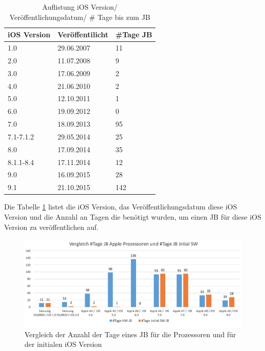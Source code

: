 \begin{table}[htp!]
    \begin{center}
        \begin{tabular}{|l|l|l|} \hline
         \textbf{iOS Version} & \textbf{Veröffentilicht} & \textbf{\#Tage JB}\\ \hline    
        1.0 & 29.06.2007 & 11\\ \hline 
        2.0 & 11.07.2008	& 9\\ \hline 
        3.0 & 17.06.2009	& 2\\ \hline 
        4.0 & 21.06.2010 & 2\\ \hline 
        5.0 & 12.10.2011	& 1\\ \hline 
        6.0 & 19.09.2012	& 0\\ \hline 
        7.0 & 18.09.2013	& 95\\ \hline 
        7.1-7.1.2 & 29.05.2014 & 25\\ \hline 
        8.0 & 17.09.2014	& 35\\ \hline 
        8.1.1-8.4 & 17.11.2014	& 12\\ \hline 
        9.0 & 16.09.2015	& 28\\ \hline
        9.1 & 21.10.2015	& 142\\ \hline 
        \end{tabular} 
        \caption{Auflistung iOS Version/ Veröffentlichungsdatum/ \# Tage bis zum JB}
        \label{tab:iOSVersion}
    \end{center}
\end{table}

Die Tabelle \ref{tab:iOSVersion} listet die iOS Version, das Veröffentlichungsdatum diese iOS Version und die Anzahl an Tagen die benötigt wurden, um einen JB für diese iOS Version zu veröffentlichen auf.   
\begin{figure}[htbp]
        \centering
                \includegraphics[scale=0.55]{Bilder/iDeviceJB-SW-HW.png}
         \caption{Vergleich der Anzahl der Tage eines JB für die Prozessoren und für der initialen iOS Version}
        \label{fig:VergleichJBProzessorSW}      
\end{figure}

